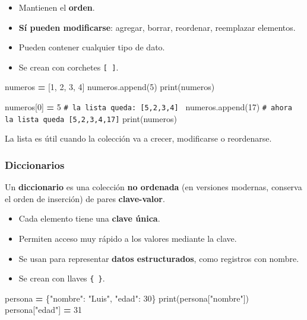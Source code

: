 \documentclass[
]{book}
\newenvironment{Shaded}{\begin{snugshade}}{\end{snugshade}}
\newcommand{\BuiltInTok}[1]{#1}
\newcommand{\CommentTok}[1]{\textcolor[rgb]{0.56,0.35,0.01}{\textit{#1}}}
\newcommand{\DecValTok}[1]{\textcolor[rgb]{0.00,0.00,0.81}{#1}}
\newcommand{\NormalTok}[1]{#1}
\newcommand{\OperatorTok}[1]{\textcolor[rgb]{0.81,0.36,0.00}{\textbf{#1}}}
\newcommand{\StringTok}[1]{\textcolor[rgb]{0.31,0.60,0.02}{#1}}
\providecommand{\tightlist}{%
  \setlength{\itemsep}{0pt}\setlength{\parskip}{0pt}}
\theoremstyle{break}
\theoremstyle{nonumberplain}
\renewcommand{\CommentTok}[1]{\textcolor[rgb]{0.41,0.41,0.41}{\texttt{#1}}}
\begin{document}
\begin{itemize}
\tightlist
\item
  Mantienen el \textbf{orden}.
\item
  \textbf{Sí pueden modificarse}: agregar, borrar, reordenar, reemplazar elementos.
\item
  Pueden contener cualquier tipo de dato.
\item
  Se crean con corchetes \texttt{{[}\ {]}}.
\end{itemize}

\begin{Shaded}
\begin{Highlighting}[]
\NormalTok{numeros }\OperatorTok{=}\NormalTok{ [}\DecValTok{1}\NormalTok{, }\DecValTok{2}\NormalTok{, }\DecValTok{3}\NormalTok{, }\DecValTok{4}\NormalTok{]}
\NormalTok{numeros.append(}\DecValTok{5}\NormalTok{)}
\BuiltInTok{print}\NormalTok{(numeros)}

\NormalTok{numeros[}\DecValTok{0}\NormalTok{] }\OperatorTok{=} \DecValTok{5}     \CommentTok{\# la lista queda: [5,2,3,4] }
\NormalTok{numeros.append(}\DecValTok{17}\NormalTok{) }\CommentTok{\# ahora la lista queda [5,2,3,4,17]}
\BuiltInTok{print}\NormalTok{(numeros)}
\end{Highlighting}
\end{Shaded}

La lista es útil cuando la colección va a crecer, modificarse o reordenarse.

\subsubsection{Diccionarios}\label{diccionarios}

Un \textbf{diccionario} es una colección \textbf{no ordenada} (en versiones modernas, conserva el orden de inserción) de pares \textbf{clave-valor}.

\begin{itemize}
\tightlist
\item
  Cada elemento tiene una \textbf{clave única}.
\item
  Permiten acceso muy rápido a los valores mediante la clave.
\item
  Se usan para representar \textbf{datos estructurados}, como registros con nombre.
\item
  Se crean con llaves \texttt{\{\ \}}.
\end{itemize}

\begin{Shaded}
\begin{Highlighting}[]
\NormalTok{persona }\OperatorTok{=}\NormalTok{ \{}\StringTok{"nombre"}\NormalTok{: }\StringTok{"Luis"}\NormalTok{, }\StringTok{"edad"}\NormalTok{: }\DecValTok{30}\NormalTok{\}}
\BuiltInTok{print}\NormalTok{(persona[}\StringTok{"nombre"}\NormalTok{])}
\NormalTok{persona[}\StringTok{"edad"}\NormalTok{] }\OperatorTok{=} \DecValTok{31}
\end{Highlighting}
\end{Shaded}
\end{document}
